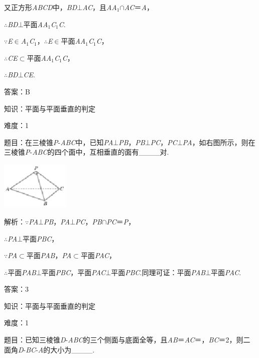 \documentclass{article} %
\begin{document}
又正方形\textit{ABCD}中，\textit{BD}$\mathrm{\bot}$\textit{AC}，且\textit{AA}${}_{1}$$\mathrm{\cap}$\textit{AC}＝\textit{A}，

$\mathrm{\therefore}$\textit{BD}$\mathrm{\bot}$平面\textit{AA}${}_{1}$\textit{C}${}_{1}$\textit{C}.

$\mathrm{\because}$\textit{E}$\mathrm{\in}$\textit{A}${}_{1}$\textit{C}${}_{1}$，$\mathrm{\therefore}$\textit{E}$\mathrm{\in}$平面\textit{AA}${}_{1}$\textit{C}${}_{1}$\textit{C}，

$\mathrm{\therefore}$\textit{CE}$\mathrm{\subset }$平面\textit{AA}${}_{1}$\textit{C}${}_{1}$\textit{C}，

$\mathrm{\therefore}$\textit{BD}$\mathrm{\bot}$\textit{CE}.

答案：B


知识：平面与平面垂直的判定

难度：1

题目：在三棱锥\textit{P}-\textit{ABC}中，已知\textit{PA}$\mathrm{\bot}$\textit{PB}，\textit{PB}$\mathrm{\bot}$\textit{PC}，\textit{PC}$\mathrm{\bot}$\textit{PA}，如右图所示，则在三棱锥\textit{P}-\textit{ABC}的四个面中，互相垂直的面有\_\_\_\_对.

\includegraphics*[width=1.29in, height=0.90in, keepaspectratio=false]{image213}

解析：$\mathrm{\because}$\textit{PA}$\mathrm{\bot}$\textit{PB}，\textit{PA}$\mathrm{\bot}$\textit{PC}，\textit{PB}$\mathrm{\cap}$\textit{PC}＝\textit{P}，

$\mathrm{\therefore}$\textit{PA}$\mathrm{\bot}$平面\textit{PBC}，

$\mathrm{\because}$\textit{PA}$\mathrm{\subset }$平面\textit{PAB}，\textit{PA}$\mathrm{\subset }$平面\textit{PAC}，

$\mathrm{\therefore}$平面\textit{PAB}$\mathrm{\bot}$平面\textit{PBC}，平面\textit{PAC}$\mathrm{\bot}$平面\textit{PBC}.同理可证：平面\textit{PAB}$\mathrm{\bot}$平面\textit{PAC}.

答案：3

知识：平面与平面垂直的判定

难度：1

题目：已知三棱锥\textit{D}-\textit{ABC}的三个侧面与底面全等，且\textit{AB}＝\textit{AC}＝，\textit{BC}＝2，则二面角\textit{D}-\textit{BC}-\textit{A}的大小为\_\_\_\_.
\end{document}
